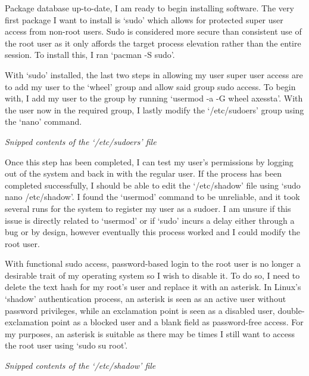Package database up-to-date, I am ready to begin installing software. The very first package I want to install is `sudo' which allows for protected super user access from non-root users. Sudo is considered more secure than consistent use of the root user as it only affords the target process elevation rather than the entire session. To install this, I ran `pacman -S sudo'.

With `sudo' installed, the last two steps in allowing my user super user access are to add my user to the `wheel' group and allow said group sudo access. To begin with, I add my user to the group by running `usermod -a -G wheel axessta'. With the user now in the required group, I lastly modify the `/etc/sudoers' group using the `nano' command.


\begin{center}
    \emph{Snipped contents of the `/etc/sudoers' file}
\end{center}

Once this step has been completed, I can test my user's permissions by logging out of the system and back in with the regular user. If the process has been completed successfully, I should be able to edit the `/etc/shadow' file using `sudo nano /etc/shadow'. I found the `usermod' command to be unreliable, and it took several runs for the system to register my user as a sudoer. I am unsure if this issue is directly related to `usermod' or if `sudo' incurs a delay either through a bug or by design, however eventually this process worked and I could modify the root user.

With functional sudo access, password-based login to the root user is no longer a desirable trait of my operating system so I wish to disable it. To do so, I need to delete the text hash for my root's user and replace it with an asterisk. In Linux's `shadow' authentication process, an asterisk is seen as an active user without password privileges, while an exclamation point is seen as a disabled user, double-exclamation point as a blocked user and a blank field as password-free access. For my purposes, an asterisk is suitable as there may be times I still want to access the root user using `sudo su root'.


\begin{center}
    \emph{Snipped contents of the `/etc/shadow' file}
\end{center}

